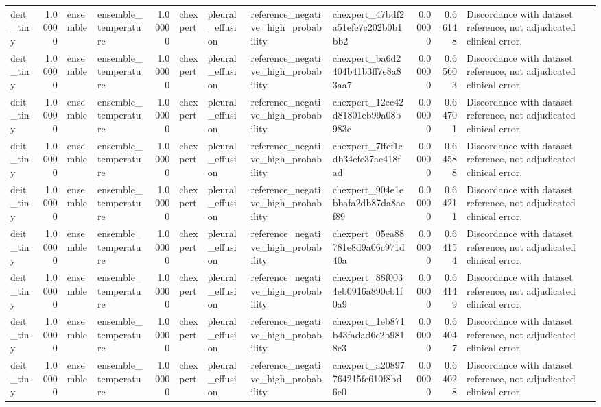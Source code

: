 \begin{tabular}{lrllrllllrrl}
deit\_tiny & 1.00000 & ensemble & ensemble\_temperature & 1.00000 & chexpert & pleural\_effusion & reference\_negative\_high\_probability & chexpert\_47bdf2a51efe7c202b0b1bb2 & 0.00000 & 0.66148 & Discordance with dataset reference, not adjudicated clinical error. \\
deit\_tiny & 1.00000 & ensemble & ensemble\_temperature & 1.00000 & chexpert & pleural\_effusion & reference\_negative\_high\_probability & chexpert\_ba6d2404b41b3ff7e8a83aa7 & 0.00000 & 0.65603 & Discordance with dataset reference, not adjudicated clinical error. \\
deit\_tiny & 1.00000 & ensemble & ensemble\_temperature & 1.00000 & chexpert & pleural\_effusion & reference\_negative\_high\_probability & chexpert\_12ec42d81801eb99a08b983e & 0.00000 & 0.64701 & Discordance with dataset reference, not adjudicated clinical error. \\
deit\_tiny & 1.00000 & ensemble & ensemble\_temperature & 1.00000 & chexpert & pleural\_effusion & reference\_negative\_high\_probability & chexpert\_7ffcf1cdb34efe37ac418fad & 0.00000 & 0.64588 & Discordance with dataset reference, not adjudicated clinical error. \\
deit\_tiny & 1.00000 & ensemble & ensemble\_temperature & 1.00000 & chexpert & pleural\_effusion & reference\_negative\_high\_probability & chexpert\_904e1ebbafa2db87da8aef89 & 0.00000 & 0.64211 & Discordance with dataset reference, not adjudicated clinical error. \\
deit\_tiny & 1.00000 & ensemble & ensemble\_temperature & 1.00000 & chexpert & pleural\_effusion & reference\_negative\_high\_probability & chexpert\_05ea88781e8d9a06c971d40a & 0.00000 & 0.64154 & Discordance with dataset reference, not adjudicated clinical error. \\
deit\_tiny & 1.00000 & ensemble & ensemble\_temperature & 1.00000 & chexpert & pleural\_effusion & reference\_negative\_high\_probability & chexpert\_88f0034eb0916a890cb1f0a9 & 0.00000 & 0.64149 & Discordance with dataset reference, not adjudicated clinical error. \\
deit\_tiny & 1.00000 & ensemble & ensemble\_temperature & 1.00000 & chexpert & pleural\_effusion & reference\_negative\_high\_probability & chexpert\_1eb871b43fadad6c2b9818c3 & 0.00000 & 0.64047 & Discordance with dataset reference, not adjudicated clinical error. \\
deit\_tiny & 1.00000 & ensemble & ensemble\_temperature & 1.00000 & chexpert & pleural\_effusion & reference\_negative\_high\_probability & chexpert\_a20897764215fe610f8bd6e0 & 0.00000 & 0.64028 & Discordance with dataset reference, not adjudicated clinical error. \\

\end{tabular}
